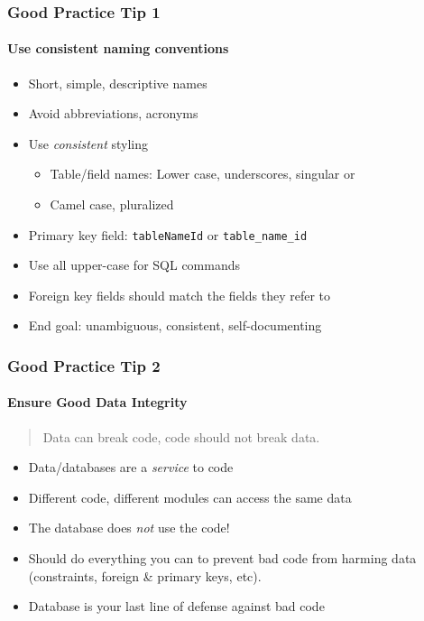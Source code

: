 \documentclass{beamer}
\begin{document}
\begin{frame}[fragile]
  \frametitle{Good Practice Tip 1}
  \framesubtitle{Use consistent naming conventions}

\begin{itemize}
  \item Short, simple, descriptive names
  \item Avoid abbreviations, acronyms
  \item Use \emph{consistent} styling
  \begin{itemize}
    \item Table/field names: Lower case, underscores, singular or
    \item Camel case, pluralized
  \end{itemize}
  \item Primary key field: \texttt{tableNameId} or \texttt{table_name_id}
  \item Use all upper-case for SQL commands
  \item Foreign key fields should match the fields they refer to
  \item End goal: unambiguous, consistent, self-documenting
\end{itemize}

\end{frame}

\begin{frame}[fragile]
  \frametitle{Good Practice Tip 2}
  \framesubtitle{Ensure Good Data Integrity}

\begin{quote}
  Data can break code, code should not break data.
\end{quote}

\begin{itemize}
  \item Data/databases are a \emph{service} to code
  \item Different code, different modules can access the same data
  \item The database does \emph{not} use the code!
  \item Should do everything you can to prevent bad code from harming data (constraints, foreign \& primary keys, etc).
  \item Database is your last line of defense against bad code
\end{itemize}

\end{frame}
\end{document}
